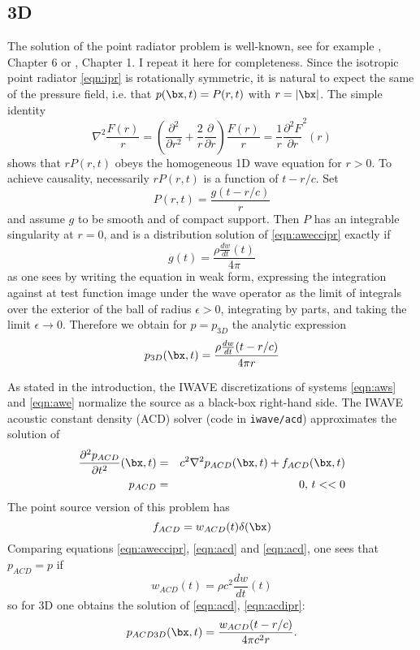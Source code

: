 \subsection{3D}
The solution of the point radiator problem is well-known, see for example \cite{CourHil:62}, Chapter 6 or \cite{GuiSte:79}, Chapter 1. I repeat it here for completeness. Since the isotropic point radiator \ref{eqn:ipr} is rotationally symmetric, it is natural to expect the same of the pressure field, i.e. that $p(\bx,t) = P(r,t)$ with $r=|\bx|$. The simple identity
\begin{equation}
\label{eqn:calc}
\nabla^2 \frac{F(r)}{r} = \left(\frac{\partial^2}{\partial r^2} + \frac{2}{r}\frac{\partial}{\partial r}\right) \frac{F(r)}{r} = \frac{1}{r}\frac{\partial^2 F}{\partial r}^2(r)
\end{equation}
shows that $rP(r,t)$ obeys the homogeneous 1D wave equation for $r>0$. To achieve causality, necessarily $rP(r,t)$ is a function of $t-r/c$. Set
\[
P(r,t) = \frac{g(t-r/c)}{r}
\]
and assume $g$ to be smooth and of compact support. Then $P$ has an integrable singularity at $r=0$, and is a distribution solution of \ref{eqn:aweccipr} exactly if
\[
g(t) = \frac{\rho\frac{dw}{dt}(t)}{4\pi}
\]
as one sees by writing the equation in weak form, expressing the integration against at test function image under the wave operator as the limit of integrals over the exterior of the ball of radius $\epsilon >0$, integrating by parts, and taking the limit $\epsilon \rightarrow 0$. Therefore we obtain for $p=p_{3D}$ the analytic expression
\begin{equation}
\label{eqn:awsol3D}
p_{3D}(\bx,t) = \frac{\rho\frac{dw}{dt}(t-r/c)}{4\pi r}
\end{equation}

As stated in the introduction, the IWAVE discretizations of systems \ref{eqn:aws} and \ref{eqn:awe} normalize the source as a black-box right-hand side. The IWAVE acoustic constant density (ACD) solver (code in {\tt iwave/acd}) approximates the solution of 
\begin{eqnarray}
\label{eqn:acd}
\frac{\partial^2 p_{ACD}}{\partial t^2}(\bx,t) & = &c^2\nabla^2 p_{ACD}(\bx,t) + f_{ACD}(\bx,t)\nonumber\\
p_{ACD} & = & 0, \,t<<0 
\end{eqnarray}
The point source version of this problem has
\begin{equation}
\label{eqn:acdipr}
f_{ACD} = w_{ACD}(t)\delta(\bx)
\end{equation}
Comparing equations \ref{eqn:aweccipr}, \ref{eqn:acd} and \ref{eqn:acd}, one sees that $p_{ACD} = p$ if 
\[
w_{ACD}(t) = \rho c^2 \frac{dw}{dt}(t) 
\]
so for 3D one obtains the solution of \ref{eqn:acd}, \ref{eqn:acdipr}:
\begin{equation}
\label{eqn:acdsol3D}
p_{ACD3D}(\bx,t) = \frac{ w_{ACD}(t-r/c)}{4\pi c^2 r}.
\end{equation}

